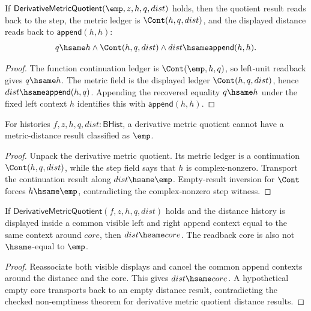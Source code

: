 \begin{theorem}
\label{thm:derivative-metric-quotient-empty-function-step-readback}
If $\mathsf{DerivativeMetricQuotient}(\emp,z,h,q,dist)$ holds, then the
quotient result reads back to the step, the metric ledger is $\Cont(h,q,dist)$,
and the displayed distance reads back to $\mathsf{append}(h,h)$:
$$
q\hsame h\land \Cont(h,q,dist)\land dist\hsame\mathsf{append}(h,h).
$$
\end{theorem}
\begin{proof}
The function continuation ledger is $\Cont(\emp,h,q)$, so left-unit readback
gives $q\hsame h$. The metric field is the displayed ledger $\Cont(h,q,dist)$,
hence $dist\hsame\mathsf{append}(h,q)$. Appending the recovered equality
$q\hsame h$ under the fixed left context $h$ identifies this with
$\mathsf{append}(h,h)$.
\end{proof}

\begin{theorem}
\label{thm:derivative-metric-quotient-distance-result-nonempty}
For histories $f,z,h,q,dist:\mathsf{BHist}$, a derivative metric quotient
cannot have a metric-distance result classified as $\emp$.
\end{theorem}
\begin{proof}
Unpack the derivative metric quotient. Its metric ledger is a continuation
$\Cont(h,q,dist)$, while the step field says that $h$ is complex-nonzero.
Transport the continuation result along $dist\hsame\emp$. Empty-result
inversion for $\Cont$ forces $h\hsame\emp$, contradicting the complex-nonzero
step witness.
\end{proof}

\begin{theorem}
\label{thm:derivative-metric-quotient-distance-visible-context-readback}
If $\mathsf{DerivativeMetricQuotient}(f,z,h,q,dist)$ holds and the distance
history is displayed inside a common visible left and right append context
equal to the same context around $core$, then $dist\hsame core$. The readback
core is also not $\hsame$-equal to $\emp$.
\end{theorem}
\begin{proof}
Reassociate both visible displays and cancel the common append contexts around
the distance and the core. This gives $dist\hsame core$. A hypothetical empty
core transports back to an empty distance result, contradicting the checked
non-emptiness theorem for derivative metric quotient distance results.
\end{proof}

